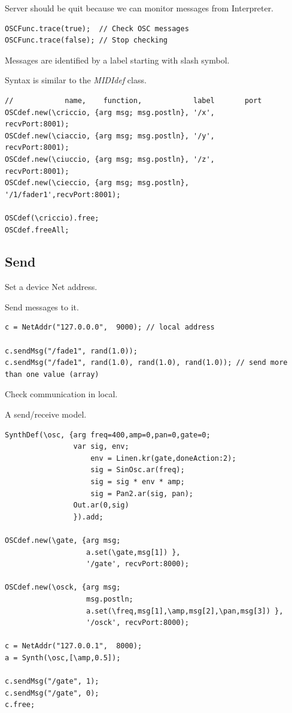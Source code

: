 Server should be quit because we can monitor messages from Interpreter.

\begin{lstlisting}[frame=single] 
OSCFunc.trace(true);  // Check OSC messages
OSCFunc.trace(false); // Stop checking
\end{lstlisting} 

Messages are identified by a label starting with slash symbol.

Syntax is similar to the \textit{MIDIdef} class.

\begin{lstlisting}[frame=single] 
//            name,    function,            label       port
OSCdef.new(\criccio, {arg msg; msg.postln}, '/x',       recvPort:8001);
OSCdef.new(\ciaccio, {arg msg; msg.postln}, '/y',       recvPort:8001);
OSCdef.new(\ciuccio, {arg msg; msg.postln}, '/z',       recvPort:8001);
OSCdef.new(\cieccio, {arg msg; msg.postln}, '/1/fader1',recvPort:8001);

OSCdef(\criccio).free; 
OSCdef.freeAll;     
\end{lstlisting} 

\subsection{Send}\label{send-osc}

Set a device Net address.

Send messages to it.

\begin{lstlisting}[frame=single] 
c = NetAddr("127.0.0.0",  9000); // local address 

c.sendMsg("/fade1", rand(1.0));
c.sendMsg("/fade1", rand(1.0), rand(1.0), rand(1.0)); // send more than one value (array)  
\end{lstlisting} 

Check communication in local.

A send/receive model.

\begin{lstlisting}[frame=single] 
SynthDef(\osc, {arg freq=400,amp=0,pan=0,gate=0;
                var sig, env;
                    env = Linen.kr(gate,doneAction:2);
                    sig = SinOsc.ar(freq);
                    sig = sig * env * amp;
                    sig = Pan2.ar(sig, pan);    
                Out.ar(0,sig)
                }).add;

OSCdef.new(\gate, {arg msg;
                   a.set(\gate,msg[1]) },        
                   '/gate', recvPort:8000);

OSCdef.new(\osck, {arg msg;
                   msg.postln;
                   a.set(\freq,msg[1],\amp,msg[2],\pan,msg[3]) },        
                   '/osck', recvPort:8000);
                   
c = NetAddr("127.0.0.1",  8000); 
a = Synth(\osc,[\amp,0.5]);

c.sendMsg("/gate", 1);
c.sendMsg("/gate", 0); 
c.free;
\end{lstlisting} 

